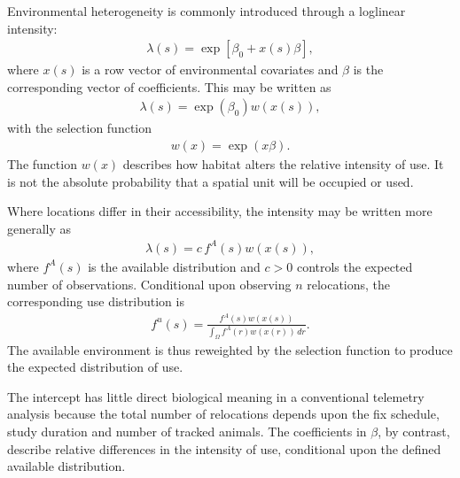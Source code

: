 \documentclass[letterpaper,10pt,english]{sphinxmanual}
\begin{document}
\sphinxAtStartPar
Environmental heterogeneity is commonly introduced through a log\sphinxhyphen{}linear intensity:
\begin{equation*}
\begin{split}
\lambda(s)
=
\exp\left[
\beta_0+x(s)\beta
\right],
\end{split}
\end{equation*}
\sphinxAtStartPar
where \(x(s)\) is a row vector of environmental covariates and \(\beta\) is the corresponding vector of coefficients. This may be written as
\begin{equation*}
\begin{split}
\lambda(s)
=
\exp(\beta_0)w\left(x(s)\right),
\end{split}
\end{equation*}
\sphinxAtStartPar
with the selection function
\begin{equation*}
\begin{split}
w(x)
=
\exp(x\beta).
\end{split}
\end{equation*}
\sphinxAtStartPar
The function \(w(x)\) describes how habitat alters the relative intensity of use. It is not the absolute probability that a spatial unit will be occupied or used.

\sphinxAtStartPar
Where locations differ in their accessibility, the intensity may be written more generally as
\begin{equation*}
\begin{split}
\lambda(s)
=
c\,f^{A}(s)w\left(x(s)\right),
\end{split}
\end{equation*}
\sphinxAtStartPar
where \(f^{A}(s)\) is the available distribution and \(c>0\) controls the expected number of observations. Conditional upon observing \(n\) relocations, the corresponding use distribution is
\begin{equation*}
\begin{split}
f^{u}(s)
=
\frac{
f^{A}(s)w\left(x(s)\right)
}{
\displaystyle
\int_{\Omega}
f^{A}(r)w\left(x(r)\right)\,dr
}.
\end{split}
\end{equation*}
\sphinxAtStartPar
The available environment is thus reweighted by the selection function to produce the expected distribution of use.

\sphinxAtStartPar
The intercept has little direct biological meaning in a conventional telemetry analysis because the total number of relocations depends upon the fix schedule, study duration and number of tracked animals. The coefficients in \(\beta\), by contrast, describe relative differences in the intensity of use, conditional upon the defined available distribution.
\end{document}
